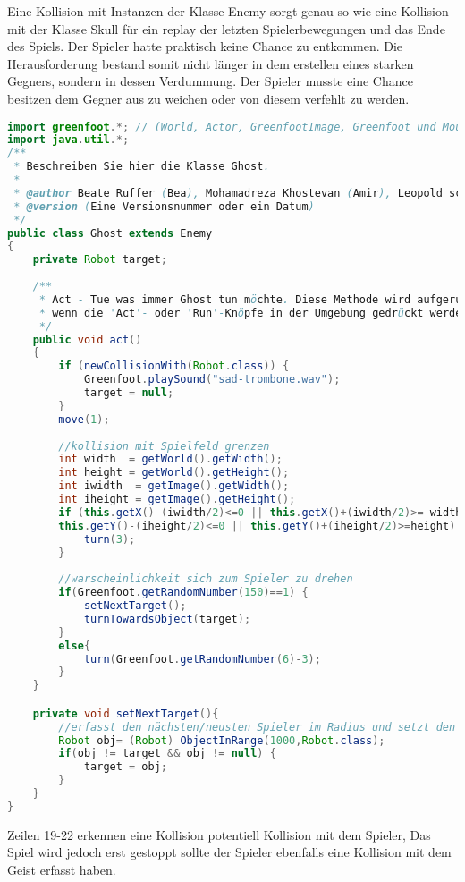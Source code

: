 \documentclass{pi1}
\begin{document}
Eine Kollision mit Instanzen der Klasse Enemy sorgt genau so wie eine Kollision mit der Klasse Skull für ein replay der letzten Spielerbewegungen und das Ende des Spiels.
Der Spieler hatte praktisch keine Chance zu entkommen. Die Herausforderung bestand somit nicht länger in dem erstellen eines starken Gegners, sondern in dessen Verdummung.
Der Spieler musste eine Chance besitzen dem Gegner aus zu weichen oder von diesem verfehlt zu werden.

\begin{lstlisting}[caption={Klasse \emph{Ghost}},firstnumber=1, language=Java]
import greenfoot.*; // (World, Actor, GreenfootImage, Greenfoot und MouseInfo)
import java.util.*;
/**
 * Beschreiben Sie hier die Klasse Ghost.
 * 
 * @author Beate Ruffer (Bea), Mohamadreza Khostevan (Amir), Leopold schulz-Hanke (Leo) 
 * @version (Eine Versionsnummer oder ein Datum)
 */
public class Ghost extends Enemy
{
    private Robot target; 
    
    /**
     * Act - Tue was immer Ghost tun möchte. Diese Methode wird aufgerufen,
     * wenn die 'Act'- oder 'Run'-Knöpfe in der Umgebung gedrückt werden.
     */
    public void act() 
    {
        if (newCollisionWith(Robot.class)) {
            Greenfoot.playSound("sad-trombone.wav");
            target = null;
        }
        move(1);
        
        //kollision mit Spielfeld grenzen
        int width  = getWorld().getWidth();
        int height = getWorld().getHeight();
        int iwidth  = getImage().getWidth();
        int iheight = getImage().getHeight();
        if (this.getX()-(iwidth/2)<=0 || this.getX()+(iwidth/2)>= width||
        this.getY()-(iheight/2)<=0 || this.getY()+(iheight/2)>=height) {
            turn(3);
        }
        
        //warscheinlichkeit sich zum Spieler zu drehen
        if(Greenfoot.getRandomNumber(150)==1) {
            setNextTarget();
            turnTowardsObject(target);
        }
        else{
            turn(Greenfoot.getRandomNumber(6)-3);
        }
    }

    private void setNextTarget(){
        //erfasst den nächsten/neusten Spieler im Radius und setzt den Geist auf diesen an
        Robot obj= (Robot) ObjectInRange(1000,Robot.class);
        if(obj != target && obj != null) {
            target = obj;
        }
    }
}
\end{lstlisting}
Zeilen 19-22 erkennen eine Kollision potentiell Kollision mit dem Spieler,
Das Spiel wird jedoch erst gestoppt sollte der Spieler ebenfalls eine Kollision mit dem Geist erfasst haben.
\end{document}
